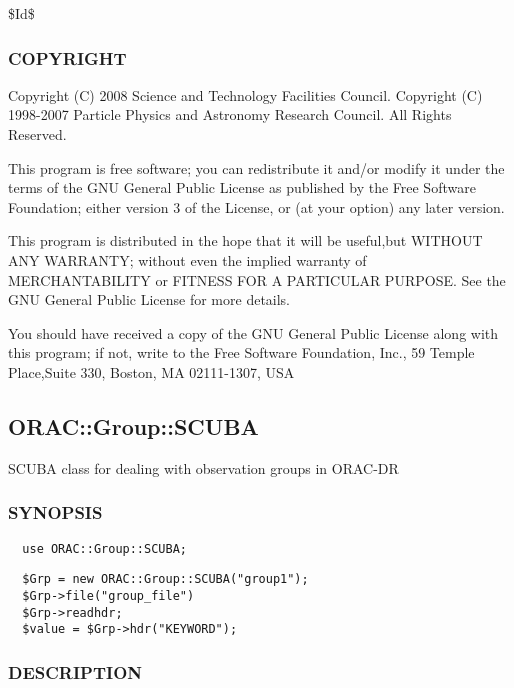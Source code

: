 \$Id\$

\subsubsection*{COPYRIGHT\label{ORAC::Group::UFTI_COPYRIGHT}}


Copyright (C) 2008 Science and Technology Facilities Council.
Copyright (C) 1998-2007 Particle Physics and Astronomy Research
Council. All Rights Reserved.



This program is free software; you can redistribute it and/or modify it under
the terms of the GNU General Public License as published by the Free Software
Foundation; either version 3 of the License, or (at your option) any later
version.



This program is distributed in the hope that it will be useful,but WITHOUT ANY
WARRANTY; without even the implied warranty of MERCHANTABILITY or FITNESS FOR A
PARTICULAR PURPOSE. See the GNU General Public License for more details.



You should have received a copy of the GNU General Public License along with
this program; if not, write to the Free Software Foundation, Inc., 59 Temple
Place,Suite 330, Boston, MA  02111-1307, USA

\subsection{ORAC::Group::SCUBA\label{ORAC::Group::SCUBA}}


SCUBA class for dealing with observation groups in ORAC-DR

\subsubsection*{SYNOPSIS\label{ORAC::Group::SCUBA_SYNOPSIS}}
\begin{verbatim}
  use ORAC::Group::SCUBA;
\end{verbatim}
\begin{verbatim}
  $Grp = new ORAC::Group::SCUBA("group1");
  $Grp->file("group_file")
  $Grp->readhdr;
  $value = $Grp->hdr("KEYWORD");
\end{verbatim}
\subsubsection*{DESCRIPTION\label{ORAC::Group::SCUBA_DESCRIPTION}}


